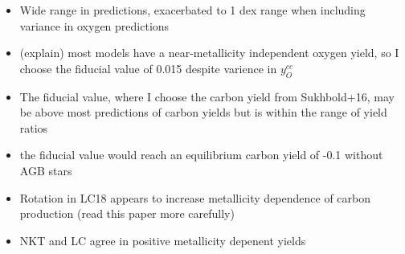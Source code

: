 \documentclass[12pt,oneside]{report}
\begin{document}
    \begin{itemize}
        \item Wide range in predictions, exacerbated to 1 dex range when including variance in oxygen predictions
        \item (explain) most models have a near-metallicity independent oxygen yield, so I choose the fiducial value of 0.015 despite varience in $y_O^{cc}$
        \item The fiducial value, where I choose the carbon yield from Sukhbold+16, may be above most predictions of carbon yields but is within the range of yield ratios
        \item the fiducial value would reach an equilibrium carbon yield of -0.1 without AGB stars
        \item Rotation in LC18 appears to increase metallicity dependence of carbon production (read this paper more carefully)
        \item NKT and LC agree in positive metallicity depenent yields
    \end{itemize}
    
\end{document}
